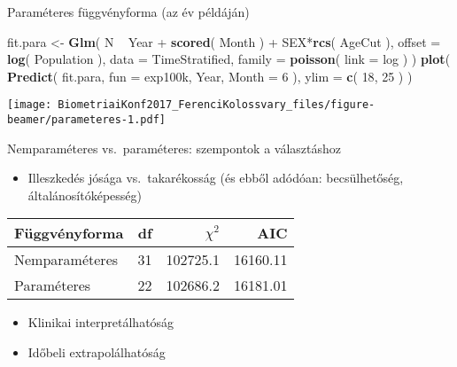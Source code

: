 \documentclass[ignorenonframetext,]{beamer}
\newenvironment{Shaded}{\begin{snugshade}}{\end{snugshade}}
\newcommand{\KeywordTok}[1]{\textcolor[rgb]{0.13,0.29,0.53}{\textbf{{#1}}}}
\newcommand{\DataTypeTok}[1]{\textcolor[rgb]{0.13,0.29,0.53}{{#1}}}
\newcommand{\DecValTok}[1]{\textcolor[rgb]{0.00,0.00,0.81}{{#1}}}
\newcommand{\StringTok}[1]{\textcolor[rgb]{0.31,0.60,0.02}{{#1}}}
\newcommand{\NormalTok}[1]{{#1}}
\providecommand{\tightlist}{%
\setlength{\itemsep}{0pt}\setlength{\parskip}{0pt}}
\begin{document}
\begin{frame}[fragile]{Paraméteres függvényforma (az év példáján)}

\begin{Shaded}
\begin{Highlighting}[]
\NormalTok{fit.para <-}\StringTok{ }\KeywordTok{Glm}\NormalTok{( N ~}\StringTok{ }\NormalTok{Year +}\StringTok{ }\KeywordTok{scored}\NormalTok{( Month ) +}\StringTok{ }\NormalTok{SEX*}\KeywordTok{rcs}\NormalTok{( AgeCut ),}
                 \DataTypeTok{offset =} \KeywordTok{log}\NormalTok{( Population ), }\DataTypeTok{data =} \NormalTok{TimeStratified,}
                 \DataTypeTok{family =} \KeywordTok{poisson}\NormalTok{( }\DataTypeTok{link =} \NormalTok{log ) )}
\KeywordTok{plot}\NormalTok{( }\KeywordTok{Predict}\NormalTok{( fit.para, }\DataTypeTok{fun =} \NormalTok{exp100k, Year, }\DataTypeTok{Month =} \DecValTok{6} \NormalTok{), }\DataTypeTok{ylim =} \KeywordTok{c}\NormalTok{( }\DecValTok{18}\NormalTok{, }\DecValTok{25} \NormalTok{) )}
\end{Highlighting}
\end{Shaded}

\texttt{[image: BiometriaiKonf2017\_FerenciKolossvary\_files/figure-beamer/parameteres-1.pdf]}

\end{frame}

\begin{frame}{Nemparaméteres vs.~paraméteres: szempontok a választáshoz}

\begin{itemize}
\tightlist
\item
  Illeszkedés jósága vs.~takarékosság (és ebből adódóan: becsülhetőség,
  általánosítóképesség)
\end{itemize}

\begin{longtable}[]{@{}lrrr@{}}
\toprule
Függvényforma & df & \(\chi^2\) & AIC\tabularnewline
\midrule
\endhead
Nemparaméteres & 31 & 102725.1 & 16160.11\tabularnewline
Paraméteres & 22 & 102686.2 & 16181.01\tabularnewline
\bottomrule
\end{longtable}

\begin{itemize}
\tightlist
\item
  Klinikai interpretálhatóság
\item
  Időbeli extrapolálhatóság
\end{itemize}

\end{frame}
\end{document}
